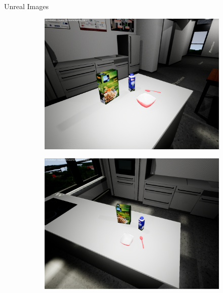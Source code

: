 \documentclass[]{beamer}
\begin{document}
\begin{frame}{Unreal Images}
\begin{figure}
\begin{subfigure}[b]{0.3\textwidth}
	\end{subfigure}
	\quad
	\begin{subfigure}[b]{0.3\textwidth}
		\includegraphics[scale=.07]{../thesis/img/chapter3/sceneEx_3}	
	\end{subfigure}
	\quad
	\begin{subfigure}[b]{0.3\textwidth}
		\includegraphics[scale=.07]{../thesis/img/chapter3/sceneEx_4}	
	\end{subfigure}
	\quad
	\begin{subfigure}[b]{0.3\textwidth}

\end{subfigure}
\end{figure}
\end{frame}
\end{document}

